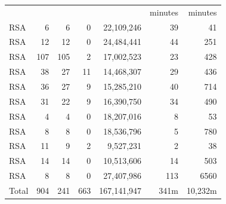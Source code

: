 \begin{table}[]
\begin{threeparttable}
\begin{tabular}{l@{}r@{~~}rrr@{~~}rr}
                           &                        &                     &                      &                 & minutes   & minutes         \\\cline{6-7}
        RSA\tnote{1}                & 6                       & 6                   & 0                    & 22,109,246    & 39     & 41           \\
        RSA\tnote{2}                & 12                      & 12                  & 0                    & 24,484,441    & 44     & 251           \\
        RSA\tnote{4}                & 107                    & 105                 & 2                    & 17,002,523   & 23      & 428           \\
        RSA\tnote{5}                & 38                     & 27                  & 11                   & 14,468,307   & 29     & 436          \\
        RSA\tnote{6}                & 36                     & 27                  & 9                    & 15,285,210   & 40     & 714          \\
        RSA\tnote{7}                & 31                     & 22                  & 9                    & 16,390,750   & 34      & 490         \\
        RSA\tnote{8}                & 4                      &  4                  & 0                    & 18,207,016   & 8      & 53          \\
        RSA\tnote{9}                & 8                      &  8                  & 0                    & 18,536,796    & 5      & 780         \\
        RSA\tnote{10} & 11& 9& 2& 9,527,231& 2 &38\\
        RSA\tnote{11} & 14& 14& 0& 10,513,606& 14 &503 \\
        RSA\tnote{12}               & 8                      &  8                  & 0                    & 27,407,986    & 113    & 6560       \\

        Total              & 904                    & 241                 & 663                & 167,141,947      & 341m  & 10,232m     \\\hline
    \end{tabular}
\end{threeparttable}
\begin{tablenotes}
    \scriptsize


\end{tablenotes}
\end{table}
